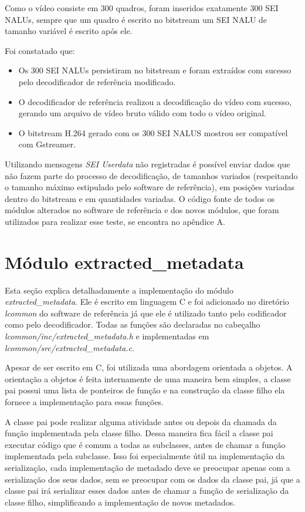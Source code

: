 Como o vídeo consiste em 300 quadros, foram inseridos exatamente 300 SEI NALUs, sempre que um quadro é escrito no bitstream um SEI NALU de tamanho variável é escrito após ele.

Foi constatado que:

\begin{itemize}
        \item Os 300 SEI NALUs persistiram no bitstream e foram extraídos com sucesso pelo decodificador de referência modificado.
        \item O decodificador de referência realizou a decodificação do vídeo com sucesso, gerando um arquivo de vídeo bruto válido com todo o vídeo original.
        \item O bitstream H.264 gerado com os 300 SEI NALUS mostrou ser compatível com Gstreamer.
\end{itemize}

Utilizando mensagens \textit{SEI Userdata} não registradas é possível enviar dados que não fazem parte do processo de decodificação, de tamanhos variados (respeitando o tamanho máximo estipulado pelo software de referência), em posições variadas dentro do bitstream e em quantidades variadas. O código fonte de todos os módulos alterados no software de referência e dos novos módulos, que foram utilizados para realizar esse teste, se encontra no apêndice A.


\section{ Módulo extracted\_metadata }


Esta seção explica detalhadamente a implementação do módulo \textit{extracted\_metadata}. Ele é escrito em linguagem C e foi adicionado no diretório \textit{lcommon} do software de referência já que ele é utilizado tanto pelo codificador como pelo decodificador. Todas as funções são declaradas no cabeçalho \textit{lcommon/inc/extracted\_metadata.h} e implementadas em \textit{lcommon/src/extracted\_metadata.c}.

Apesar de ser escrito em C, foi utilizada uma abordagem orientada a objetos. A orientação a objetos é feita internamente de uma maneira bem simples, a classe pai possui uma lista de ponteiros de função e na construção da classe filho ela fornece a implementação para essas funções.

A classe pai pode realizar alguma atividade antes ou depois da chamada da função implementada pela classe filho. Dessa maneira fica fácil a classe pai executar código que é comum a todas as subclasses, antes de chamar a função implementada pela subclasse. Isso foi especialmente útil na implementação da serialização, cada implementação de metadado deve se preocupar apenas com a serialização dos seus dados, sem se preocupar com os dados da classe pai, já que a classe pai irá serializar esses dados antes de chamar a função de serialização da classe filho, simplificando a implementação de novos metadados.

